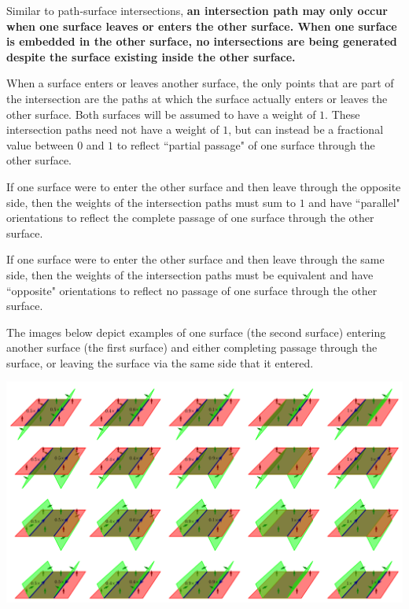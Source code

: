 Similar to path-surface intersections, {\bf an intersection path may only occur when one surface leaves or enters the other surface. When one surface is embedded in the other surface, no intersections are being generated despite the surface existing inside the other surface.}

When a surface enters or leaves another surface, the only points that are part of the intersection are the paths at which the surface actually enters or leaves the other surface. Both surfaces will be assumed to have a weight of \(1\). These intersection paths need not have a weight of \(1\), but can instead be a fractional value between \(0\) and \(1\) to reflect ``partial passage" of one surface through the other surface. 

If one surface were to enter the other surface and then leave through the opposite side, then the weights of the intersection paths must sum to \(1\) and have ``parallel" orientations to reflect the complete passage of one surface through the other surface.

If one surface were to enter the other surface and then leave through the same side, then the weights of the intersection paths must be equivalent and have ``opposite" orientations to reflect no passage of one surface through the other surface.

The images below depict examples of one surface (the second surface) entering another surface (the first surface) and either completing passage through the surface, or leaving the surface via the same side that it entered. 

%
%

\begin{center}
\includegraphics[width = \textwidth]{Intersections/Surface-surface_intersections/surface_surface_intersection_generalized_boundary_case}
\end{center}

